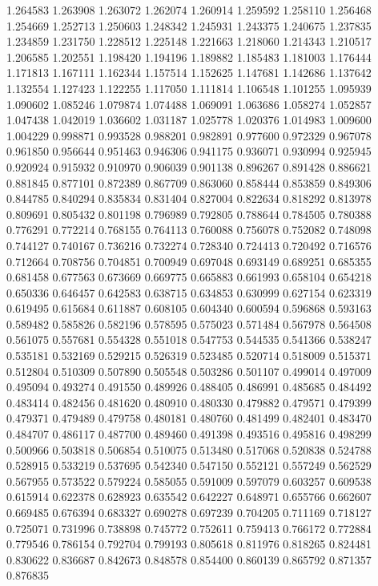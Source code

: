1.264583
1.263908
1.263072
1.262074
1.260914
1.259592
1.258110
1.256468
1.254669
1.252713
1.250603
1.248342
1.245931
1.243375
1.240675
1.237835
1.234859
1.231750
1.228512
1.225148
1.221663
1.218060
1.214343
1.210517
1.206585
1.202551
1.198420
1.194196
1.189882
1.185483
1.181003
1.176444
1.171813
1.167111
1.162344
1.157514
1.152625
1.147681
1.142686
1.137642
1.132554
1.127423
1.122255
1.117050
1.111814
1.106548
1.101255
1.095939
1.090602
1.085246
1.079874
1.074488
1.069091
1.063686
1.058274
1.052857
1.047438
1.042019
1.036602
1.031187
1.025778
1.020376
1.014983
1.009600
1.004229
0.998871
0.993528
0.988201
0.982891
0.977600
0.972329
0.967078
0.961850
0.956644
0.951463
0.946306
0.941175
0.936071
0.930994
0.925945
0.920924
0.915932
0.910970
0.906039
0.901138
0.896267
0.891428
0.886621
0.881845
0.877101
0.872389
0.867709
0.863060
0.858444
0.853859
0.849306
0.844785
0.840294
0.835834
0.831404
0.827004
0.822634
0.818292
0.813978
0.809691
0.805432
0.801198
0.796989
0.792805
0.788644
0.784505
0.780388
0.776291
0.772214
0.768155
0.764113
0.760088
0.756078
0.752082
0.748098
0.744127
0.740167
0.736216
0.732274
0.728340
0.724413
0.720492
0.716576
0.712664
0.708756
0.704851
0.700949
0.697048
0.693149
0.689251
0.685355
0.681458
0.677563
0.673669
0.669775
0.665883
0.661993
0.658104
0.654218
0.650336
0.646457
0.642583
0.638715
0.634853
0.630999
0.627154
0.623319
0.619495
0.615684
0.611887
0.608105
0.604340
0.600594
0.596868
0.593163
0.589482
0.585826
0.582196
0.578595
0.575023
0.571484
0.567978
0.564508
0.561075
0.557681
0.554328
0.551018
0.547753
0.544535
0.541366
0.538247
0.535181
0.532169
0.529215
0.526319
0.523485
0.520714
0.518009
0.515371
0.512804
0.510309
0.507890
0.505548
0.503286
0.501107
0.499014
0.497009
0.495094
0.493274
0.491550
0.489926
0.488405
0.486991
0.485685
0.484492
0.483414
0.482456
0.481620
0.480910
0.480330
0.479882
0.479571
0.479399
0.479371
0.479489
0.479758
0.480181
0.480760
0.481499
0.482401
0.483470
0.484707
0.486117
0.487700
0.489460
0.491398
0.493516
0.495816
0.498299
0.500966
0.503818
0.506854
0.510075
0.513480
0.517068
0.520838
0.524788
0.528915
0.533219
0.537695
0.542340
0.547150
0.552121
0.557249
0.562529
0.567955
0.573522
0.579224
0.585055
0.591009
0.597079
0.603257
0.609538
0.615914
0.622378
0.628923
0.635542
0.642227
0.648971
0.655766
0.662607
0.669485
0.676394
0.683327
0.690278
0.697239
0.704205
0.711169
0.718127
0.725071
0.731996
0.738898
0.745772
0.752611
0.759413
0.766172
0.772884
0.779546
0.786154
0.792704
0.799193
0.805618
0.811976
0.818265
0.824481
0.830622
0.836687
0.842673
0.848578
0.854400
0.860139
0.865792
0.871357
0.876835

